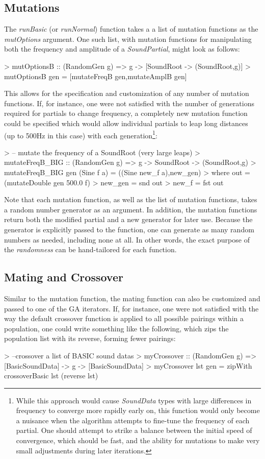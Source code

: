 \documentclass[11pt]{article}
\begin{document}
\subsection{Mutations}
The \emph{runBasic} (or \emph{runNormal}) function takes a a list of mutation functions as the \emph{mutOptions} argument. One such list, with mutation functions for manipulating both the frequency and amplitude of a \emph{SoundPartial}, might look as follows:
\begin{code}
> mutOptionsB :: (RandomGen g) => g -> [SoundRoot -> (SoundRoot,g)]
> mutOptionsB gen = [mutateFreqB gen,mutateAmplB gen]
\end{code}
This allows for the specification and customization of any number of mutation functions. If, for instance, one were not satisfied with the number of generations required for partials to change frequency, a completely new mutation function could be specified which would allow individual partials to leap long distances (up to 500Hz in this case) with each generation\footnote{While this approach would cause \emph{SoundData} types with large differences in frequency to converge more rapidly early on, this function would only become a nuisance when the algorithm attempts to fine-tune the frequency of each partial. One should attempt to strike a balance between the initial speed of convergence, which should be fast, and the ability for mutations to make very small adjustments during later iterations.}:
\begin{code}
> -- mutate the frequency of a SoundRoot (very large leaps)
> mutateFreqB_BIG :: (RandomGen g) => g -> SoundRoot -> (SoundRoot,g)
> mutateFreqB_BIG gen (Sine f a) = ((Sine new_f a),new_gen)
>   where out = (mutateDouble gen 500.0 f)
>         new_gen = snd out
>         new_f = fst out
\end{code}
Note that each mutation function, as well as the list of mutation functions, takes a random number generator as an argument. In addition, the mutation functions return both the modified partial and a new generator for later use. Because the generator is explicitly passed to the function, one can generate as many random numbers as needed, including none at all. In other words, the exact purpose of the \emph{randomness} can be hand-tailored for each function.
\subsection{Mating and Crossover}
Similar to the mutation function, the mating function can also be customized and passed to one of the GA iterators. If, for instance, one were not satisfied with the way the default crossover function is applied to all possible pairings within a population, one could write something like the following, which zips the population list with its reverse, forming fewer pairings:
\begin{code}
> --crossover a list of BASIC sound datas
> myCrossover :: (RandomGen g) => [BasicSoundData] -> g -> [BasicSoundData]
> myCrossover lst gen = zipWith crossoverBasic lst (reverse lst)
\end{code}
\end{document}
